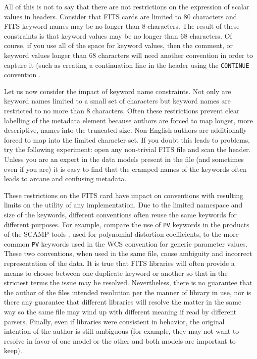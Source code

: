 \documentclass[final,authoryear,5p,times,twocolumn]{elsarticle}
\begin{document}
{{All of this is not to say that there are not restrictions on the expression
of scalar values in headers. Consider that FITS cards are limited to 80
characters and FITS keyword names may be no longer than 8 characters. The
result of these constraints is that keyword values may be no longer than
68 characters. Of course, if you use all of the space for keyword values,
then the comment, or keyword values longer than 68 characters will need
another convention in order to capture it (such as creating a continuation
line in the header using the \texttt{CONTINUE} convention \citep{2007Continue}.


Let us now consider the impact of keyword name constraints. Not only
are keyword names limited to a small set of characters but keyword
names are restricted to no more than 8 characters. Often these
restrictions prevent clear labelling of the metadata element because
authors are forced to map longer, more descriptive, names into the
truncated size. Non-English authors are additionally forced to map
into the limited character set. If you doubt this leads to problems,
try the following experiment: open any non-trivial FITS file and scan
the header. Unless you are an expert in the data models present in the
file (and sometimes even if you are) it is easy to find that the
cramped names of the keywords often leads to arcane and confusing
metadata.


These restrictions on the FITS card have impact on conventions with
resulting limits on the utility of any implementation. Due to the limited
namespace and size of the keywords, different conventions often reuse
the same keywords for different purposes.  For example, compare the use
of \texttt{PV} keywords in the products of the SCAMP tools
\citep{2006ASPC..351..112B}, used for polynomial distortion coefficients,
to the more common \texttt{PV} keywords used in the WCS convention for generic
parameter values. 
These two conventions, when used in the same file, cause ambiguity and
incorrect representation of the data. It is true that FITS libraries
will often provide a means to choose between one duplicate keyword or another
so that in the strictest terms the issue may be resolved.
Nevertheless, there is no guarantee that the author of
the files intended resolution per the manner of library in use, nor is there any
guarantee that different libraries will resolve the matter in the same way
so the same file may wind up with different meaning if read by different parsers.
Finally, even if libraries were consistent in behavior, the original intention
of the author is still ambiguous (for example, they may not want to resolve
in favor of one model or the other and both models are important to keep).


}}
\end{document}
